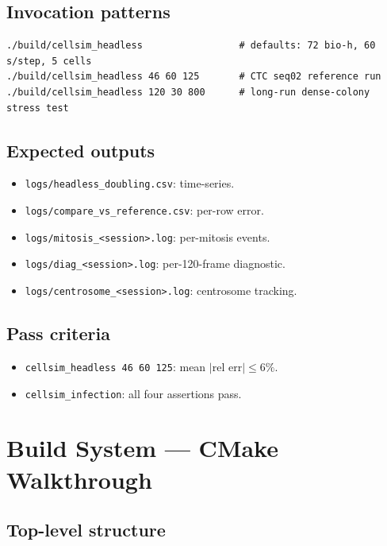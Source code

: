\documentclass[11pt,letterpaper,twoside,openany]{book}
\newcommand{\code}[1]{\texttt{#1}}
\newcommand{\file}[1]{\texttt{\small#1}}
\begin{document}
\section{Invocation patterns}

\begin{verbatim}
./build/cellsim_headless                 # defaults: 72 bio-h, 60 s/step, 5 cells
./build/cellsim_headless 46 60 125       # CTC seq02 reference run
./build/cellsim_headless 120 30 800      # long-run dense-colony stress test
\end{verbatim}

\section{Expected outputs}

\begin{itemize}
  \item \file{logs/headless\_doubling.csv}: time-series.
  \item \file{logs/compare\_vs\_reference.csv}: per-row error.
  \item \file{logs/mitosis\_<session>.log}: per-mitosis events.
  \item \file{logs/diag\_<session>.log}: per-120-frame diagnostic.
  \item \file{logs/centrosome\_<session>.log}: centrosome tracking.
\end{itemize}

\section{Pass criteria}

\begin{itemize}
  \item \code{cellsim\_headless 46 60 125}: mean $|\text{rel
        err}| \le 6\%$.
  \item \code{cellsim\_infection}: all four assertions pass.
\end{itemize}

\chapter{Build System --- CMake Walkthrough}
\label{ch:cmake-deep}

\section{Top-level structure}
\end{document}
